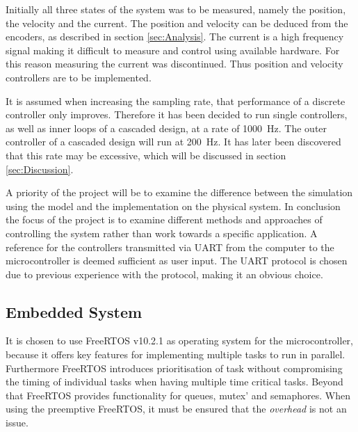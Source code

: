 \documentclass[../../main.tex]{subfiles}
\begin{document}
Initially all three states of the system was to be measured, namely the position, the velocity and the current. The position and velocity can be deduced from the encoders, as described in section \ref{sec:Analysis}. The current is a high frequency signal making it difficult to measure and control using available hardware. For this reason measuring the current was discontinued. Thus position and velocity controllers are to be implemented.

It is assumed when increasing the sampling rate, that performance of a discrete controller only improves. Therefore it has been decided to run single controllers, as well as inner loops of a cascaded design, at a rate of \SI{1000}{\hertz}. The outer controller of a cascaded design will run at \SI{200}{\hertz}. It has later been discovered that this rate may be excessive, which will be discussed in section \ref{sec:Discussion}.

A priority of the project will be to examine the difference between the simulation using the model and the implementation on the physical system. In conclusion the focus of the project is to examine different methods and approaches of controlling the system rather than work towards a specific application. A reference for the controllers transmitted via UART from the computer to the microcontroller is deemed sufficient as user input. The UART protocol is chosen due to previous experience with the protocol, making it an obvious choice. 



\subsection*{Embedded System}
It is chosen to use FreeRTOS v10.2.1 as operating system for the microcontroller, because it offers key features for implementing multiple tasks to run in parallel. Furthermore FreeRTOS introduces prioritisation of task without compromising the timing of individual tasks when having multiple time critical tasks. Beyond that FreeRTOS provides functionality for queues, mutex' and semaphores. When using the preemptive FreeRTOS, it must be ensured that the \textit{overhead} is not an issue.

\end{document}
